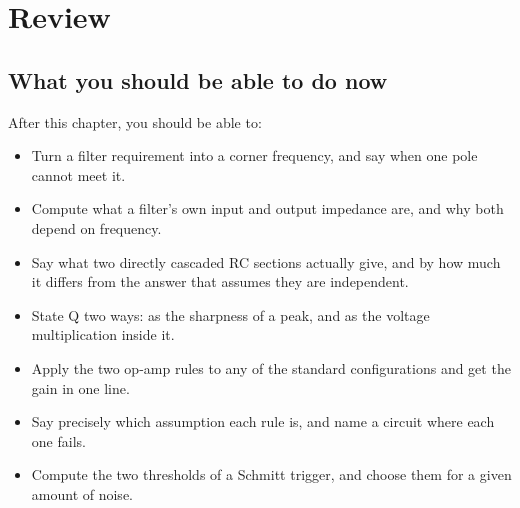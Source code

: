 

\section{Review}
\label{c3:sec:review}

\subsection*{What you should be able to do now}
After this chapter, you should be able to:
\begin{itemize}
  \item Turn a filter requirement into a corner frequency, and say when one pole cannot meet it.
  \item Compute what a filter's own input and output impedance are, and why both depend on frequency.
  \item Say what two directly cascaded RC sections actually give, and by how much it differs from the answer that assumes they are independent.
  \item State Q two ways: as the sharpness of a peak, and as the voltage multiplication inside it.
  \item Apply the two op-amp rules to any of the standard configurations and get the gain in one line.
  \item Say precisely which assumption each rule is, and name a circuit where each one fails.
  \item Compute the two thresholds of a Schmitt trigger, and choose them for a given amount of noise.
\end{itemize}

